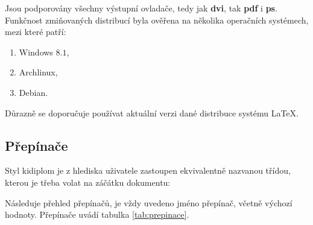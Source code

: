 \documentclass[
  field=inf,
  biblatex,
  glossaries,
  index
]{kidiplom}
\begin{document}
Jsou podporovány všechny výstupní ovladače, tedy jak \textbf{dvi}, tak \textbf{pdf} i \textbf{ps}. Funkčnost zmiňovaných distribucí byla ověřena na několika operačních systémech, mezi které patří:
\begin{enumerate}
\item Windows $8.1$,
\item Archlinux,
\item Debian.
\end{enumerate}

Důrazně se doporučuje používat aktuální verzi dané distribuce systému \LaTeX{}.


\subsection{Přepínače}
Styl kidiplom je z hlediska uživatele zastoupen ekvivalentně nazvanou třídou, kterou je třeba volat na záčátku dokumentu:

Následuje přehled přepínačů, je vždy uvedeno jméno přepínač, včetně výchozí hodnoty. Přepínače uvádí tabulka \ref{tab:prepinace}.
\end{document}
